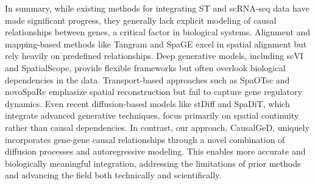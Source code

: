 In summary, while existing methods for integrating ST and scRNA-seq data have made significant progress, they generally lack explicit modeling of causal relationships between genes, a critical factor in biological systems. Alignment and mapping-based methods like Tangram and SpaGE excel in spatial alignment but rely heavily on predefined relationships. Deep generative models, including scVI and SpatialScope, provide flexible frameworks but often overlook biological dependencies in the data. Transport-based approaches such as SpaOTsc and novoSpaRc emphasize spatial reconstruction but fail to capture gene regulatory dynamics. Even recent diffusion-based models like stDiff and SpaDiT, which integrate advanced generative techniques, focus primarily on spatial continuity rather than causal dependencies. In contrast, our approach, CausalGeD, uniquely incorporates gene-gene causal relationships through a novel combination of diffusion processes and autoregressive modeling. This enables more accurate and biologically meaningful integration, addressing the limitations of prior methods and advancing the field both technically and scientifically.